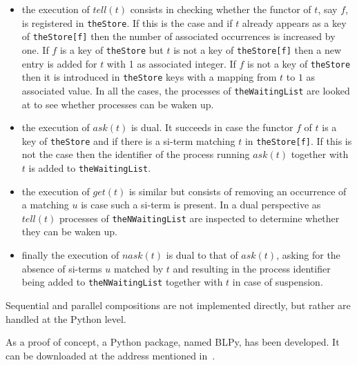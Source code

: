 \begin{itemize}

\item the execution of $tell(t)$ consists in checking whether the
  functor of $t$, say $f$, is registered in \texttt{theStore}. If this
  is the case and if $t$ already appears as a key of
  \texttt{theStore[f]} then the number of associated occurrences is
  increased by one. If $f$ is a key of \texttt{theStore} but $t$ is
  not a key of \texttt{theStore[f]} then a new entry is added for $t$
  with 1 as associated integer. If $f$ is not a key of
  \texttt{theStore} then it is introduced in \texttt{theStore} keys
  with a mapping from $t$ to $1$ as associated value. In all the
  cases, the processes of \texttt{theWaitingList} are looked at to see
  whether processes can be waken up.

\item the execution of $ask(t)$ is dual. It succeeds in case the
  functor $f$ of $t$ is a key of \texttt{theStore} and if there is a
  si-term matching $t$ in \texttt{theStore[f]}. If this is not the
  case then the identifier of the process running $ask(t)$ together
  with $t$ is added to \texttt{theWaitingList}.

\item the execution of $get(t)$ is similar but consists of removing an
  occurrence of a matching $u$ is case such a si-term is present. In a
  dual perspective as $tell(t)$ processes of \texttt{theNWaitingList}
  are inspected to determine whether they can be waken up.

\item finally the execution of $nask(t)$ is dual to that of $ask(t)$, asking for the absence of si-terms $u$ matched by $t$ and resulting in the process identifier being added to \texttt{theNWaitingList} together with $t$ in case of suspension.
  
\end{itemize}

Sequential and parallel compositions are not implemented directly, but rather 
are handled at the Python level.

As a proof of concept, a Python package, named BLPy, has been developed. It can be downloaded at the address mentioned in~\cite{BLPy}. 


